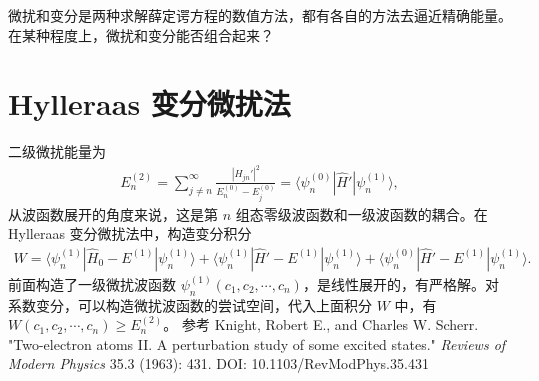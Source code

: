 
微扰和变分是两种求解薛定谔方程的数值方法，都有各自的方法去逼近精确能量。在某种程度上，微扰和变分能否组合起来？

\section{Hylleraas 变分微扰法}
二级微扰能量为
\begin{align}
    E_n^{(2)} = \sum_{j\neq n}^{\infty} \frac{|H_{jn}'|^2}{E_n^{(0)}-E_j^{(0)}} = \langle \psi_n^{(0)} | \hat H' | \psi_n^{(1)} \rangle, 
\end{align}
从波函数展开的角度来说，这是第 $n$ 组态零级波函数和一级波函数的耦合。在 Hylleraas 变分微扰法中，构造变分积分 
\begin{align}
    W = \langle \psi_n^{(1)} | \hat H_0 - E^{(1)} | \psi_n^{(1)} \rangle 
    + \langle \psi_n^{(1)} | \hat H' - E^{(1)} | \psi_n^{(1)} \rangle 
    + \langle \psi_n^{(0)} | \hat H' - E^{(1)} | \psi_n^{(1)} \rangle. 
\end{align}
前面构造了一级微扰波函数 $\psi_n^{(1)}(c_1, c_2, \cdots, c_n)$，是线性展开的，有严格解。对系数变分，可以构造微扰波函数的尝试空间，代入上面积分 $W$ 中，有 $W(c_1, c_2, \cdots, c_n) \geqslant E_n^{(2)}$。
参考 Knight, Robert E., and Charles W. Scherr. "Two-electron atoms II. A perturbation study of some excited states." \textit{Reviews of Modern Physics} 35.3 (1963): 431. DOI: 10.1103/RevModPhys.35.431 

